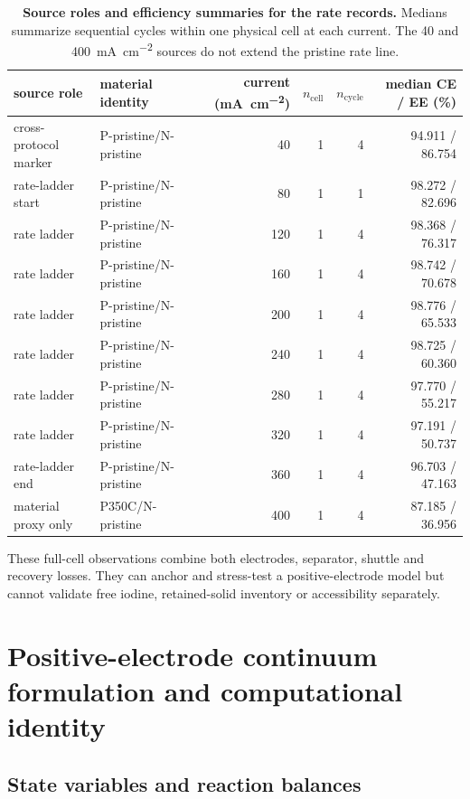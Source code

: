 \documentclass[11pt]{article}
\let\SIorigsubsection\subsection
\renewcommand{\subsection}{\FloatBarrier\SIorigsubsection}
\begin{document}
\begin{table}[!htbp]
\centering\small
\caption{\textbf{Source roles and efficiency summaries for the rate records.} Medians summarize sequential
cycles within one physical cell at each current. The 40 and \SI{400}{mA.cm^{-2}} sources do not extend the
pristine rate line.}
\label{tab:rate-records}
\begin{tabular}{llrrrr}
\toprule
source role & material identity & current (\si{mA.cm^{-2}}) & $n_{\mathrm{cell}}$ & $n_{\mathrm{cycle}}$ & median CE / EE (\%)\\
\midrule
cross-protocol marker & P-pristine/N-pristine & 40 & 1 & 4 & 94.911 / 86.754\\
rate-ladder start & P-pristine/N-pristine & 80 & 1 & 1 & 98.272 / 82.696\\
rate ladder & P-pristine/N-pristine & 120 & 1 & 4 & 98.368 / 76.317\\
rate ladder & P-pristine/N-pristine & 160 & 1 & 4 & 98.742 / 70.678\\
rate ladder & P-pristine/N-pristine & 200 & 1 & 4 & 98.776 / 65.533\\
rate ladder & P-pristine/N-pristine & 240 & 1 & 4 & 98.725 / 60.360\\
rate ladder & P-pristine/N-pristine & 280 & 1 & 4 & 97.770 / 55.217\\
rate ladder & P-pristine/N-pristine & 320 & 1 & 4 & 97.191 / 50.737\\
rate-ladder end & P-pristine/N-pristine & 360 & 1 & 4 & 96.703 / 47.163\\
material proxy only & P350C/N-pristine & 400 & 1 & 4 & 87.185 / 36.956\\
\bottomrule
\end{tabular}
\end{table}

These full-cell observations combine both electrodes, separator, shuttle and recovery losses. They can anchor
and stress-test a positive-electrode model but cannot validate free iodine, retained-solid inventory or
accessibility separately.

\section{Positive-electrode continuum formulation and computational identity}

\subsection{State variables and reaction balances}
\end{document}
